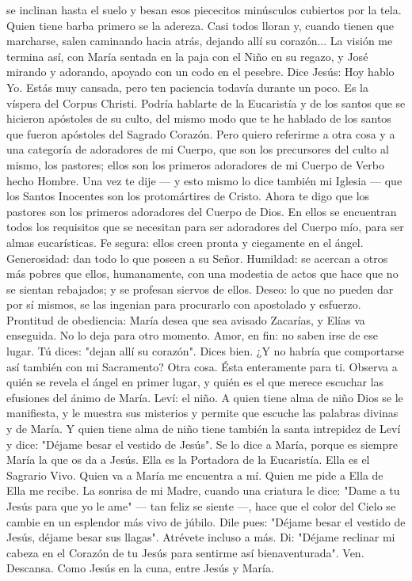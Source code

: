 \documentclass[12pt]{book} %
\begin{document}
se inclinan hasta el suelo y besan esos piececitos minúsculos cubiertos por la tela. Quien tiene barba primero se la adereza. Casi todos lloran y, cuando tienen que marcharse, salen caminando hacia atrás, dejando allí su corazón... 
La visión me termina así, con María sentada en la paja con el Niño en su regazo, y José mirando y adorando, apoyado 
con un codo en el pesebre. 
Dice Jesús: 
Hoy hablo Yo. Estás muy cansada, pero ten paciencia todavía durante un poco. 
Es la víspera del Corpus Christi. Podría hablarte de la Eucaristía y de los santos que se hicieron apóstoles de su culto, del mismo modo que te he hablado de los santos que fueron apóstoles del Sagrado Corazón. Pero quiero referirme a otra cosa y a una categoría de adoradores de mi Cuerpo, que son los precursores del culto al mismo, los pastores; ellos son los primeros adoradores de mi Cuerpo de Verbo hecho Hombre. 
Una vez te dije — y esto mismo lo dice también mi Iglesia — que los Santos Inocentes son los protomártires de Cristo. 
Ahora te digo que los pastores son los primeros adoradores del Cuerpo de Dios. En ellos se encuentran todos los 
requisitos que se necesitan para ser adoradores del Cuerpo mío, para ser almas eucarísticas. 
Fe segura: ellos creen pronta y ciegamente en el ángel. 
Generosidad: dan todo lo que poseen a su Señor. 
Humildad: se acercan a otros más pobres que ellos, humanamente, con una modestia de actos que hace que no se 
sientan rebajados; y se profesan siervos de ellos. 
Deseo: lo que no pueden dar por sí mismos, se las ingenian para procurarlo con apostolado y esfuerzo. 
Prontitud de obediencia: María desea que sea avisado Zacarías, y Elías va enseguida. No lo deja para otro momento. Amor, en fin: no saben irse de ese lugar. Tú dices: "dejan allí su corazón". Dices bien. 
¿Y no habría que comportarse así también con mi Sacramento? 
Otra cosa. Ésta enteramente para ti. Observa a quién se revela el ángel en primer lugar, y quién es el que merece 
escuchar las efusiones del ánimo de María. Leví: el niño. 
A quien tiene alma de niño Dios se le manifiesta, y le muestra sus misterios y permite que escuche las palabras divinas y 
de María. Y quien tiene alma de niño tiene también la santa intrepidez de Leví y dice: "Déjame besar el vestido de Jesús". Se lo dice a María, porque es siempre María la que os da a Jesús. Ella es la Portadora de la Eucaristía. Ella es el Sagrario Vivo. 
Quien va a María me encuentra a mí. Quien me pide a Ella de Ella me recibe. La sonrisa de mi Madre, cuando una criatura le dice: "Dame a tu Jesús para que yo le ame" — tan feliz se siente —, hace que el color del Cielo se cambie en un esplendor más vivo de júbilo. 
Dile pues: "Déjame besar el vestido de Jesús, déjame besar sus llagas". Atrévete incluso a más. Di: "Déjame reclinar mi 
cabeza en el Corazón de tu Jesús para sentirme así bienaventurada". Ven. Descansa. Como Jesús en la cuna, entre Jesús y María. 
 
\end{document}
